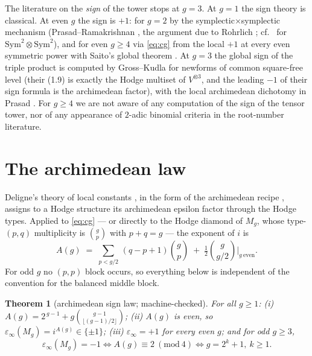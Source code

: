 \documentclass[11pt]{article}
\newtheorem{theorem}{Theorem}
\newcommand{\Sym}{\mathrm{Sym}}
\newcommand{\eps}{\varepsilon}
\begin{document}
The literature on the \emph{sign} of the tower stops at $g=3$.  At $g=1$ the sign
theory is classical.  At even $g$ the sign is $+1$: for $g=2$ by the
symplectic$\times$symplectic mechanism (Prasad--Ramakrishnan \cite[Prop.~2.1]{PR},
the argument due to Rohrlich \cite{RohrlichWD}; cf.\ \cite[Prop.~6.1]{PR} for
$\Sym^2\!\otimes\Sym^2$), and for even $g\ge4$ via \eqref{eq:cg} from the local
$+1$ at every even symmetric power \cite[Prop.~7.1]{DMW} with Saito's global
theorem \cite{Saito}.  At $g=3$ the global sign of the triple product is computed
by Gross--Kudla \cite{GrossKudla} for newforms of common square-free level (their
(1.9) is exactly the Hodge multiset of $V^{\otimes3}$, and the leading $-1$ of
their sign formula is the archimedean factor), with the local archimedean
dichotomy in Prasad \cite{PrasadTri}.  For $g\ge4$ we are not aware of any
computation of the sign of the tensor tower, nor of any appearance of $2$-adic
binomial criteria in the root-number literature.

\section{The archimedean law}

Deligne's theory of local constants \cite{DeligneLNM}, in the form of the
archimedean recipe \cite[\S5.3]{DeligneAnvers}, assigns to a Hodge structure its
archimedean epsilon factor through the Hodge types.  Applied to \eqref{eq:cg} --- or
directly to the Hodge diamond of $M_g$, whose type-$(p,q)$ multiplicity is
$\binom gp$ with $p+q=g$ --- the exponent of $i$ is
\[
A(g)\;=\;\sum_{p<g/2}\,(q-p+1)\binom gp\;+\;\tfrac12\binom g{g/2}\Big|_{g\ \mathrm{even}} .
\]
For odd $g$ no $(p,p)$ block occurs, so everything below is independent of the
convention for the balanced middle block.

\begin{theorem}[archimedean sign law; machine-checked]\label{thm:arch}
For all $g\ge1$:
\emph{(i)} $A(g)=2^{\,g-1}+g\binom{g-1}{\lfloor(g-1)/2\rfloor}$;
\emph{(ii)} $A(g)$ is even, so $\eps_\infty(M_g)=i^{A(g)}\in\{\pm1\}$;
\emph{(iii)} $\eps_\infty=+1$ for every even $g$; and for odd $g\ge3$,
\[
\eps_\infty(M_g)=-1\iff A(g)\equiv2\ (\mathrm{mod}\ 4)\iff g=2^k+1,\ k\ge1 .
\]
\end{theorem}
\end{document}
